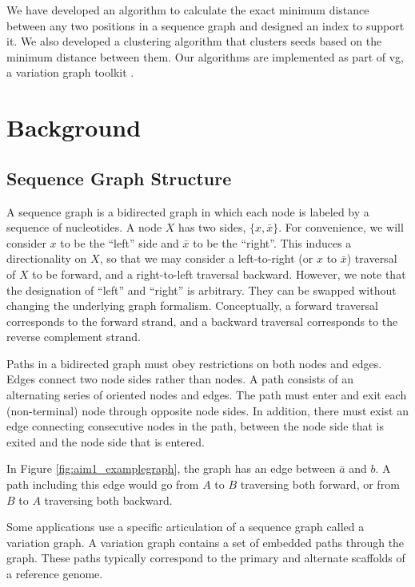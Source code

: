 \documentclass[11pt]{ucscthesis}
\begin{document}
We have developed an algorithm to calculate the exact minimum distance between any two positions in a sequence graph and designed an index to support it. We also developed a clustering algorithm that clusters seeds based on the minimum distance between them. Our algorithms are implemented as part of vg, a variation graph toolkit \cite{garrison_variation_2018}.

\section{Background}

\subsection{Sequence Graph Structure}


A sequence graph is a bidirected graph in which each node is labeled by a sequence of nucleotides.
A node $X$ has two sides, $\{x, \bar{x}\}$. For convenience, we will consider $x$  to be the ``left'' side and $\bar x$ to be the ``right''.
This induces a directionality on $X$, so that we may consider a left-to-right (or $x$ to $\bar{x}$) traversal of $X$ to be forward, and a right-to-left traversal backward.
However, we note that the designation of ``left'' and ``right'' is arbitrary.
They can be swapped without changing the underlying graph formalism.
Conceptually, a forward traversal corresponds to the forward strand, and a backward traversal corresponds to the reverse complement strand.

Paths in a bidirected graph must obey restrictions on both nodes and edges.
Edges connect two node sides rather than nodes.
A path consists of an alternating series of oriented nodes and edges.
The path must enter and exit each (non-terminal) node through opposite node sides.
In addition, there must exist an edge connecting consecutive nodes in the path, between the node side that is exited and the node side that is entered.

In Figure \ref{fig:aim1_examplegraph}, the graph has an edge between $\bar{a}$ and $b$.
A path including this edge would go from $A$ to $B$ traversing both forward, or from $B$ to $A$ traversing both backward.
    
Some applications use a specific articulation of a sequence graph called a variation graph.
A variation graph contains a set of embedded paths through the graph.
These paths typically correspond to the primary and alternate scaffolds of a reference genome.
\end{document}
